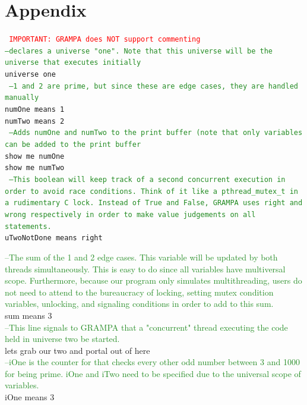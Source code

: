 \documentclass[numbers]{sigplanconf}
\begin{document}
\section{Appendix}
{\tt
\textcolor{red}{IMPORTANT: GRAMPA does NOT support commenting}\\
\textcolor{ForestGreen}{--declares a universe "one". Note that this universe will be the universe that executes initially}\\ universe one \\

\textcolor{ForestGreen}{  --1 and 2 are prime, but since these are edge cases, they are handled manually}\\
\indent numOne means 1\\
\indent numTwo means 2\\

\textcolor{ForestGreen}{  --Adds numOne and numTwo to the print buffer (note that only variables can be added to the print buffer}\\
\indent show me numOne\\
\indent show me numTwo\\

\textcolor{ForestGreen}{  --This boolean will keep track of a second concurrent execution in order to avoid race conditions. Think of it like a pthread\_mutex\_t in a rudimentary C lock. Instead of True and False, GRAMPA uses right and wrong respectively in order to make value judgements on all statements.}\\
\indent uTwoNotDone means right

\textcolor{ForestGreen}{  --The sum of the 1 and 2 edge cases. This variable will be updated by both threads simultaneously. This is easy to do since all variables have multiversal scope. Furthermore, because our program only simulates multithreading, users do not need to attend to the bureaucracy of locking, setting mutex condition variables, unlocking, and signaling conditions in order to add to this sum.}\\
\indent sum means 3\\

\textcolor{ForestGreen}{  --This line signals to GRAMPA that a "concurrent" thread executing the code held in universe two be started.} \\
\indent lets grab our two and portal out of here \\

\textcolor{ForestGreen}{  --iOne is the counter for that checks every other odd number between 3 and 1000 for being prime. iOne and iTwo need to be specified due to the universal scope of variables.} \\
\indent iOne means 3 \\

}
\end{document}
